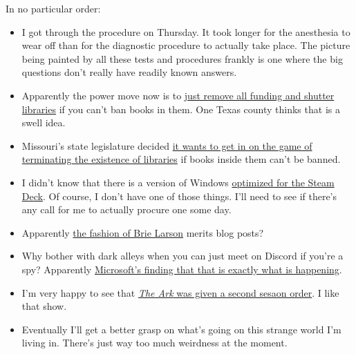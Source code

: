 In no particular order:

\begin{itemize}
\tightlist
\item
  I got through the procedure on Thursday. It took longer for the
  anesthesia to wear off than for the diagnostic procedure to actually
  take place. The picture being painted by all these tests and
  procedures frankly is one where the big questions don't really have
  readily known answers.\\
\item
  Apparently the power move now is to
  \href{https://web.archive.org/web/20230415081034/https://www.newsweek.com/texas-library-may-face-elimination-weeks-after-banned-books-return-1793510}{just
  remove all funding and shutter libraries} if you can't ban books in
  them. One Texas county thinks that is a swell idea.
\item
  Missouri's state legislature decided
  \href{https://web.archive.org/web/20230415103204/https://www.salon.com/2023/04/12/missouri-state-vote-to-defund-public-libraries_partner/}{it
  wants to get in on the game of terminating the existence of libraries}
  if books inside them can't be banned.\\
\item
  I didn't know that there is a version of Windows
  \href{https://www.kotaku.com.au/2023/04/microsoft-devs-built-a-basic-version-of-windows-optimised-for-steam-deck/}{optimized
  for the Steam Deck}. Of course, I don't have one of those things. I'll
  need to see if there's any call for me to actually procure one some
  day.
\item
  Apparently
  \href{https://www.giantfreakinrobot.com/ent/brie-larson-marvels-bra.html}{the
  fashion of Brie Larson} merits blog posts?\\
\item
  Why bother with dark alleys when you can just meet on Discord if
  you're a spy? Apparently
  \href{https://www.techspot.com/news/98313-microsoft-warns-russian-agents-trying-infiltrate-gaming-communities.html}{Microsoft's
  finding that that is exactly what is happening}.
\item
  I'm very happy to see that
  \href{https://web.archive.org/web/20230415094020/https://variety.com/2023/tv/news/the-ark-renewed-season-2-syfy-1235580978/}{\emph{The
  Ark} was given a second sesaon order}. I like that show.
\item
  Eventually I'll get a better grasp on what's going on this strange
  world I'm living in. There's just way too much weirdness at the
  moment.
\end{itemize}
